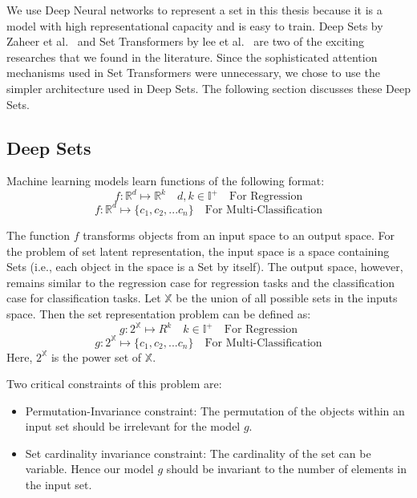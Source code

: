 \documentclass[12pt, twoside, ngerman]{report}
\begin{document}
We use Deep Neural networks to represent a set in this thesis because it is a model with high representational capacity and is easy to train.
Deep Sets by Zaheer et al.~\cite{deepSets} and Set Transformers by lee et al.~\cite{setTransformer} are two of the exciting researches that we found in the literature.
Since the sophisticated attention mechanisms used in Set Transformers were unnecessary,  we chose to use the simpler architecture used in Deep Sets.
The following section discusses these Deep Sets.

\subsection{Deep Sets}
\label{sec:DeepSets}

Machine learning models learn functions of the following format:
$$
f : \mathbb{R}^d \mapsto \mathbb{R}^k \quad d,k \in \mathbb{I}^+ \quad \textrm{For Regression}
$$
$$
f : \mathbb{R}^d \mapsto \{c_1, c_2, ... c_n\}  \quad \textrm{For Multi-Classification}
$$

The function $f$ transforms objects from an input space to an output space.
For the problem of set latent representation, the input space is a space containing Sets (i.e., each object in the space is a Set by itself).
The output space, however, remains similar to the regression case for regression tasks and the classification case for classification tasks.
Let $\mathbb{X}$ be the union of all possible sets in the inputs space.
Then the set representation problem can be defined as:
$$
g : 2^{\mathbb{X}} \mapsto R^k   \quad k \in \mathbb{I}^+ \quad \textrm{For Regression}
$$
$$
g : 2^{\mathbb{X}} \mapsto \{c_1, c_2, ... c_n\}  \quad \textrm{For Multi-Classification}
$$
Here, $2^{\mathbb{X}}$ is the power set of $\mathbb{X}$.

Two critical constraints of this problem are:
\begin{itemize}
\item Permutation-Invariance constraint: The permutation of the objects within an input set should be irrelevant for the model $g$.
\item Set cardinality invariance constraint: The cardinality of the set can be variable.
Hence our model $g$ should be invariant to the number of elements in the input set.
\end{itemize}
\end{document}
